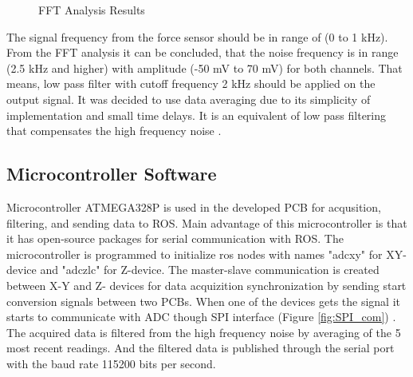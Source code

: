 \begin{figure}[h]%
\centering
{}%
\qquad
{}%
\caption{FFT Analysis Results}
\end{figure}
	
	The signal frequency from the force sensor should be in range of (0 to 1 kHz). From the FFT analysis it can be concluded, that the noise frequency is in range (2.5 kHz and higher) with amplitude (-50 mV to 70 mV) for both channels. That means, low pass filter with cutoff frequency 2 kHz should be applied on the output signal. It was decided to use data averaging due to its simplicity of implementation and small time delays. It is an equivalent of low pass filtering that compensates the high frequency noise \cite{filtering_mov_ave}.

	\subsection{Microcontroller Software}
	\label{sec:MicrSoft}
	Microcontroller ATMEGA328P is used in the developed PCB for acqusition, filtering, and sending data to ROS. Main advantage of this microcontroller is that it has open-source packages for serial communication with ROS. The microcontroller is programmed to initialize ros nodes with names "adc\textunderscore xy" for XY-device and "adc\textunderscore zlc" for Z-device. The master-slave communication is created between X-Y and Z- devices for data acquizition synchronization by sending start conversion signals between two PCBs. When one of the devices gets the signal it starts to communicate with ADC though SPI interface (Figure \ref{fig:SPI_com}) \cite{introduction_SPI}. The acquired data is filtered from the high frequency noise by averaging of the 5 most recent readings. And the filtered data is published through the serial port with the baud rate 115200 bits per second. 
	
